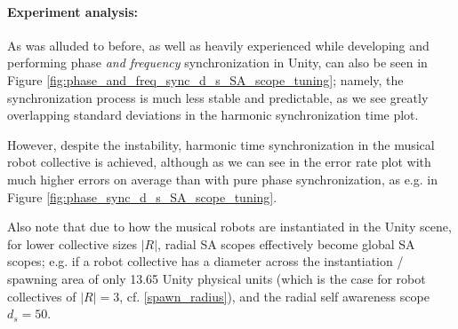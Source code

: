 				\paragraph{Experiment analysis:\nl}
				
				As was alluded to before, as well as heavily experienced while developing and performing phase \textit{and frequency} synchronization in Unity, can also be seen in Figure \ref{fig:phase_and_freq_sync_d_s_SA_scope_tuning}; namely, the synchronization process is much less stable and predictable, as we see greatly overlapping standard deviations in the harmonic synchronization time plot.
				
				However, despite the instability, harmonic time synchronization in the musical robot collective is achieved, although as we can see in the error rate plot with much higher errors on average than with pure phase synchronization, as e.g. in Figure \ref{fig:phase_sync_d_s_SA_scope_tuning}.
				
				Also note that due to how the musical robots are instantiated in the Unity scene, for lower collective sizes $|R|$, radial SA scopes effectively become global SA scopes; e.g. if a robot collective has a diameter across the instantiation / spawning area of only 13.65 Unity physical units (which is the case for robot collectives of $|R|=3$, cf. \eqref{spawn_radius}), and the radial self awareness scope $d_s=50$.
	
	
		
			
			
			
